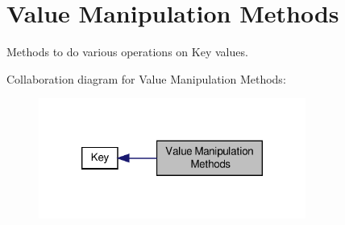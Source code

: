 \hypertarget{group__keyvalue}{\section{Value Manipulation Methods}
\label{group__keyvalue}
}


Methods to do various operations on Key values.  


Collaboration diagram for Value Manipulation Methods\-:
\nopagebreak
\begin{figure}[H]
\begin{center}
\leavevmode
\includegraphics[width=248pt]{group__keyvalue}
\end{center}
\end{figure}
